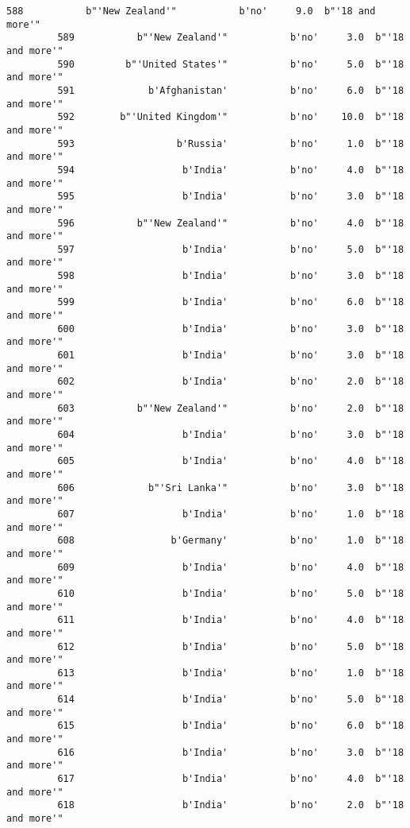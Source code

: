 \documentclass[11pt]{article}
\begin{document}
\begin{Verbatim}[commandchars=\\\{\}]
         588           b"'New Zealand'"           b'no'     9.0  b"'18 and more'"   
         589           b"'New Zealand'"           b'no'     3.0  b"'18 and more'"   
         590         b"'United States'"           b'no'     5.0  b"'18 and more'"   
         591             b'Afghanistan'           b'no'     6.0  b"'18 and more'"   
         592        b"'United Kingdom'"           b'no'    10.0  b"'18 and more'"   
         593                  b'Russia'           b'no'     1.0  b"'18 and more'"   
         594                   b'India'           b'no'     4.0  b"'18 and more'"   
         595                   b'India'           b'no'     3.0  b"'18 and more'"   
         596           b"'New Zealand'"           b'no'     4.0  b"'18 and more'"   
         597                   b'India'           b'no'     5.0  b"'18 and more'"   
         598                   b'India'           b'no'     3.0  b"'18 and more'"   
         599                   b'India'           b'no'     6.0  b"'18 and more'"   
         600                   b'India'           b'no'     3.0  b"'18 and more'"   
         601                   b'India'           b'no'     3.0  b"'18 and more'"   
         602                   b'India'           b'no'     2.0  b"'18 and more'"   
         603           b"'New Zealand'"           b'no'     2.0  b"'18 and more'"   
         604                   b'India'           b'no'     3.0  b"'18 and more'"   
         605                   b'India'           b'no'     4.0  b"'18 and more'"   
         606             b"'Sri Lanka'"           b'no'     3.0  b"'18 and more'"   
         607                   b'India'           b'no'     1.0  b"'18 and more'"   
         608                 b'Germany'           b'no'     1.0  b"'18 and more'"   
         609                   b'India'           b'no'     4.0  b"'18 and more'"   
         610                   b'India'           b'no'     5.0  b"'18 and more'"   
         611                   b'India'           b'no'     4.0  b"'18 and more'"   
         612                   b'India'           b'no'     5.0  b"'18 and more'"   
         613                   b'India'           b'no'     1.0  b"'18 and more'"   
         614                   b'India'           b'no'     5.0  b"'18 and more'"   
         615                   b'India'           b'no'     6.0  b"'18 and more'"   
         616                   b'India'           b'no'     3.0  b"'18 and more'"   
         617                   b'India'           b'no'     4.0  b"'18 and more'"   
         618                   b'India'           b'no'     2.0  b"'18 and more'"   

\end{Verbatim}
\end{document}
